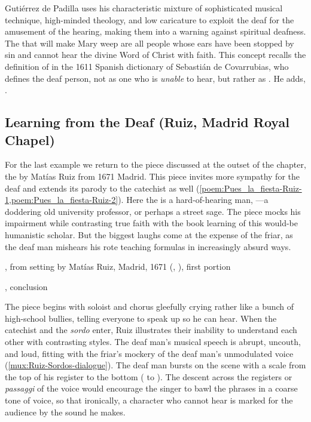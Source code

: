 Gutiérrez de Padilla uses his characteristic mixture of sophisticated musical
technique, high-minded theology, and low caricature to exploit the deaf for the
amusement of the hearing, making them into a warning against spiritual deafness.
The  that will make Mary weep are all people whose ears have
been stopped by sin and cannot hear the divine Word of Christ with faith.
This concept recalls the definition of  in the 1611 Spanish
dictionary of Sebastián de Covarrubias, who defines the deaf person, not as one
who is \emph{unable} to hear, but rather as .
He adds, .%
    \Autocite
    [.] 
    {Covarrubias:Tesoro}

\subsection{Learning from the Deaf (Ruiz, Madrid Royal Chapel)}

For the last example we return to the piece discussed at the outset of the
chapter, the  by Matías Ruiz from 1671
Madrid.
This piece invites more sympathy for the deaf and extends its parody to the
catechist as well
(\cref{poem:Pues_la_fiesta-Ruiz-1,poem:Pues_la_fiesta-Ruiz-2}).
Here the  is a hard-of-hearing man, ---a doddering old university professor, or perhaps a street
sage.
The piece mocks his impairment while contrasting true faith with the book
learning of this would-be humanistic scholar.
But the biggest laughs come at the expense of the friar, as the deaf man
mishears his rote teaching formulas in increasingly absurd ways.

{, from setting by
Matías Ruiz, Madrid, 1671 (, ), first
portion}

{, conclusion}

The piece begins with soloist and chorus gleefully crying  rather like a bunch of high-school bullies, telling everyone to speak
up so he can hear.
When the catechist and the \emph{sordo} enter, Ruiz illustrates their inability
to understand each other with contrasting styles.
The deaf man's musical speech is abrupt, uncouth, and loud, fitting with the
friar's mockery of the deaf man's unmodulated voice
(\cref{mux:Ruiz-Sordos-dialogue}).
The deaf man bursts on the scene with a scale from the top of his register to
the bottom ( to ).
The descent across the registers or \emph{passaggi} of the voice would encourage
the singer to bawl the phrases in a coarse tone of voice, so that ironically, a
character who cannot hear is marked for the audience by the sound he makes.

